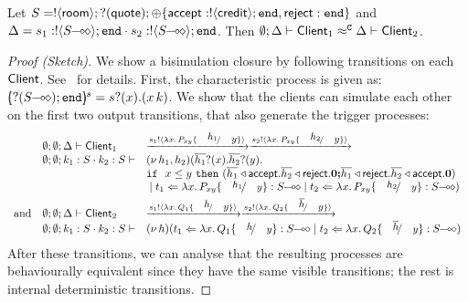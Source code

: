 \documentclass[a4paper,UKenglish]{lipics}
\theoremstyle{definition}
\begin{document}
\begin{proposition}\label{p:examp}
	Let
	$S = ! \langle \mathsf{room} \rangle ; ? (\mathsf{quote}) ; \oplus \{\mathsf{accept}: ! \langle \mathsf{credit} \rangle ; \mathtt{end}, \mathsf{reject}: \mathtt{end}\}$ and 
$\Delta = s_1: \btout{\lhot{S}} \tinact \cat s_2: \btout{\lhot{S}} \tinact$. 
Then
	$ \emptyset; \Delta \vdash \mathsf{Client}_1 \approx^\mathtt{C} \Delta \vdash \mathsf{Client}_2$. %
\end{proposition}
\begin{proof}[Proof (Sketch)]
	\noi We show a bisimulation closure by following transitions on each $\mathsf{Client}$.
	See~\cite{KouzapasPY15} for details.
	First, the characteristic process is given as:
	$\mapchar{\btinp{\lhot{S}} \tinact}{s} = \binp{s}{x} (\appl{x}{k})$.
We show that the clients can simulate each other on
the first two output transitions, that also generate the trigger
processes:
%
\[
	\begin{array}{lll}
&	\es; \es; \Delta \proves \Client_1
	&
		\by{\bactout{s_1}{\abs{x}{P_{xy} \subst{h_1}{y}}}}
		\by{\bactout{s_2}{\abs{x}{P_{xy} \subst{h_2}{y}}}}
		\\
&		\es; \es; k_1: S \cat k_2: S \proves
		&
		\newsp{h_1, h_2}{\binp{\dual{h_1}}{x} \binp{\dual{h_2}}{y}\\
&		& \If\ x \leq y\ \Then (\bsel{\dual{h_1}}{\accept} \bsel{\dual{h_2}}{\reject} \inact
		\Else \bsel{\dual{h_1}}{\reject} \bsel{\dual{h_2}}{\accept} \inact)\\
&		& \Par \ftrigger{t_1}{\abs{x}{P_{xy} \subst{h_1}{y}}}{\lhot{S}} \Par \ftrigger{t_2}{\abs{x}{P_{xy} \subst{h_2}{y}}}{\lhot{S}}}
		\\[1mm]
\mbox{and} &
		\es; \es; \Delta \proves \Client_2
		&\by{\bactout{s_1}{\abs{x}{Q_1 \subst{h}{y}}}}
		\by{\bactout{s_2}{\abs{x}{Q_2 \subst{\dual{h}}{y}}}}
		\\
&		\es; \es; k_1: S \cat k_2: S \proves & \newsp{h}{
		\ftrigger{t_1}{\abs{x}{Q_1 \subst{h}{y}}}{\lhot{S}} \Par \ftrigger{t_2}{\abs{x}{Q_2 \subst{\dual{h}}{y}}}{\lhot{S}}}
	\end{array}
\]
	\noi 
After these transitions, 
we can analyse that 
the resulting processes are behaviourally equivalent
since they have the same visible transitions; the rest 
is internal deterministic transitions. 
\end{proof}
\end{document}
